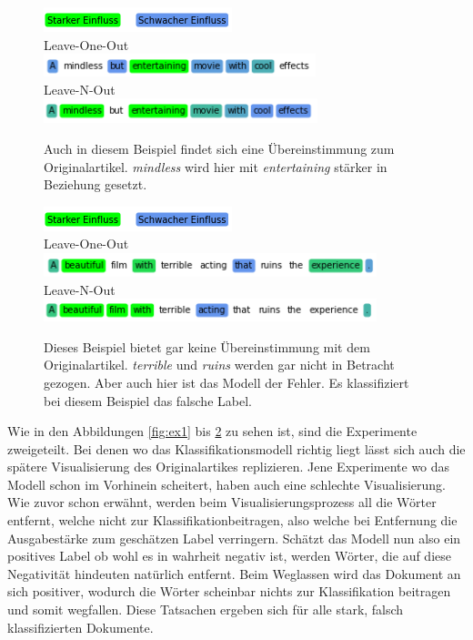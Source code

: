 \documentclass[DIV=13,fontsize=11pt]{scrartcl}
\begin{document}
\begin{figure}[H]
    \centering
    \includegraphics[]{img/legend.png}\\
    Leave-One-Out\\
    \includegraphics[]{img/third_ex_loo.png}\\
    Leave-N-Out\\
    \includegraphics[]{img/third_ex_lno.png}
    \caption{Auch in diesem Beispiel findet sich eine Übereinstimmung zum Originalartikel. \textit{mindless} wird hier mit \textit{entertaining} stärker in Beziehung gesetzt.}
    \label{fig:ex3}
\end{figure}

\begin{figure}[H]
    \centering
    \includegraphics[]{img/legend.png}\\
    Leave-One-Out\\
    \includegraphics[]{img/fourth_ex_loo.png}\\
    Leave-N-Out\\
    \includegraphics[]{img/fourth_ex_lno.png}
    \caption{Dieses Beispiel bietet gar keine Übereinstimmung mit dem Originalartikel. \textit{terrible} und \textit{ruins} werden gar nicht in Betracht gezogen. Aber auch hier ist das Modell der Fehler. Es klassifiziert bei diesem Beispiel das falsche Label.}
    \label{fig:ex4}
\end{figure}

Wie in den Abbildungen \ref{fig:ex1} bis \ref{fig:ex4} zu sehen ist, sind die Experimente zweigeteilt. Bei denen wo das
Klassifikationsmodell richtig liegt lässt sich auch die spätere Visualisierung des Originalartikes replizieren.
Jene Experimente wo das Modell schon im Vorhinein scheitert, haben auch eine schlechte Visualisierung.
Wie zuvor schon erwähnt, werden beim Visualisierungsprozess all die Wörter entfernt, welche nicht zur
Klassifikationbeitragen, also welche bei Entfernung die Ausgabestärke zum geschätzen Label verringern.
Schätzt das Modell nun also ein positives Label ob wohl es in wahrheit negativ ist, werden Wörter, die auf diese
Negativität hindeuten natürlich entfernt. Beim Weglassen wird das Dokument an sich positiver, wodurch die Wörter
scheinbar nichts zur Klassifikation beitragen und somit wegfallen.
Diese Tatsachen ergeben sich für alle stark, falsch klassifizierten Dokumente.
\end{document}
